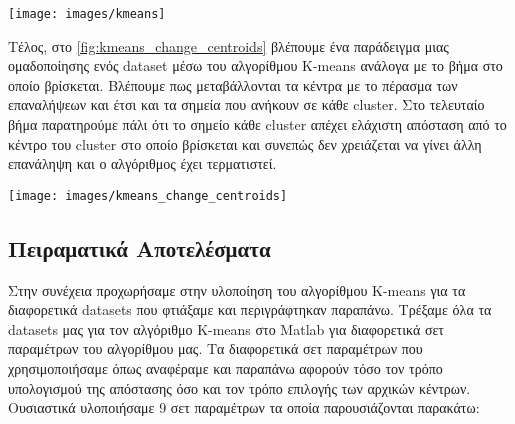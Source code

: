 \noindent\begin{minipage}{\linewidth}
    \centering
    \texttt{[image: images/kmeans]}
    \label{fig:kmeans}
\end{minipage}

Τέλος,
στο \hyperref[fig:kmeans_change_centroids]{\figurename{} \ref{fig:kmeans_change_centroids}}
βλέπουμε ένα παράδειγμα μιας ομαδοποίησης ενός dataset μέσω του αλγορίθμου K-means ανάλογα με το βήμα στο οποίο βρίσκεται. Βλέπουμε πως μεταβάλλονται τα κέντρα με το πέρασμα των επαναλήψεων και έτσι και τα σημεία που ανήκουν σε κάθε cluster. Στο τελευταίο βήμα παρατηρούμε πάλι ότι το σημείο κάθε cluster απέχει ελάχιστη απόσταση από το κέντρο του cluster στο οποίο βρίσκεται και συνεπώς δεν χρειάζεται να γίνει άλλη επανάληψη και ο αλγόριθμος έχει τερματιστεί.

\noindent\begin{minipage}{\linewidth}
    \centering
    \texttt{[image: images/kmeans\_change\_centroids]}
    \label{fig:kmeans_change_centroids}
\end{minipage}

\subsection{Πειραματικά Αποτελέσματα}
Στην συνέχεια προχωρήσαμε στην υλοποίηση του αλγορίθμου K-means για τα διαφορετικά datasets που φτιάξαμε και περιγράφτηκαν παραπάνω. Τρέξαμε όλα τα datasets μας για τον αλγόριθμο K-means στο Matlab για διαφορετικά σετ παραμέτρων του αλγορίθμου μας. Τα διαφορετικά σετ παραμέτρων που χρησιμοποιήσαμε όπως αναφέραμε και παραπάνω αφορούν τόσο τον τρόπο υπολογισμού της απόστασης όσο και τον τρόπο επιλογής των αρχικών κέντρων. Ουσιαστικά υλοποιήσαμε 9 σετ παραμέτρων τα οποία παρουσιάζονται παρακάτω:

